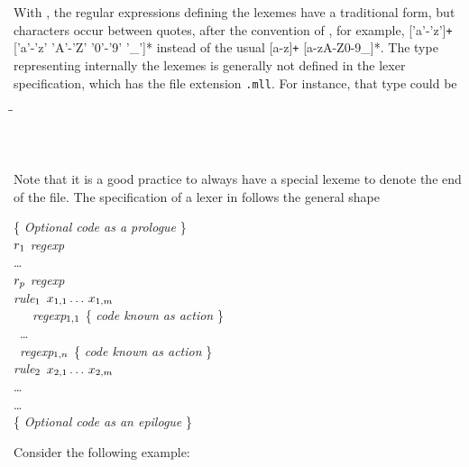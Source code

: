 \documentclass[12pt,a4paper]{article}
\begin{document}
With \ocamllex, the regular expressions defining the lexemes have a
traditional form, but characters occur between quotes, after the
convention of \OCaml, for example, \textsf{['a'-'z']\texttt{+}
  ['a'-'z' 'A'-'Z' '0'-'9' '\_']*} instead of the usual
\textsf{[a-z]\texttt{+} [a-zA-Z0-9\_]*}. The \OCaml type representing
internally the lexemes is generally not defined in the lexer
specification, which has the file extension \texttt{.mll}. For
instance, that type could be
\begin{tabbing}
 \Xtype {} \= \equal \= \Tint \Xof {} \vbar{}
 \Tident \Xof {} \vbar{} \Ttrue \vbar{} \Tfalse\\
 \> \vbar \> \Tplus \vbar{} \Tminus \vbar{} \Ttimes \vbar{} \Tslash
 \vbar{} \Tequal \vbar{} \Tarrow\\
 \> \vbar \> \Tlpar \vbar{} \Trpar \vbar{} \Tlet \vbar{} \Tin \vbar{} \Trec\\
 \> \vbar \> \Tfun \vbar{}
 \Tif \vbar{} \Tthen \vbar{} \Telse \vbar{} \Tand \vbar{} \Tor \vbar{}
 \Tnot \vbar{} \Teof
\end{tabbing}
Note that it is a good practice to always have a special lexeme \Teof
to denote the end of the file. The specification of a lexer in
\ocamllex follows the general shape
\begin{tabbing}
\{ \emph{Optional \OCaml code as a prologue} \}\\
\Xlet \(r\sb{1}\) \equal \emph{regexp}\\
\ldots\\
\Xlet \(r\sb{p}\) \equal \emph{regexp}\\
\Xrule \= \emph{rule}\(\sb{1}\) \(x\sb{1,1} \dots\, x\sb{1,m}\) \equal \Xparse\\
\> \ \ \ \emph{regexp}\(\sb{1,1}\) \{ \emph{\OCaml code known as
  \emph{action}} \}\\
\> \vbar{} \ \ldots\\
\> \vbar{} \ \emph{regexp}\(\sb{1,n}\) \{ \emph{\OCaml code known as \emph{action}} \}\\
\Xand \= \emph{rule}\(\sb{2}\) \(x\sb{2,1} \dots\, x\sb{2,m}\) \equal \Xparse\\
\> \ldots\\
\Xand \ldots\\
\{ \emph{Optional \OCaml code as an epilogue} \}
\end{tabbing}
Consider the following example:
\end{document}
